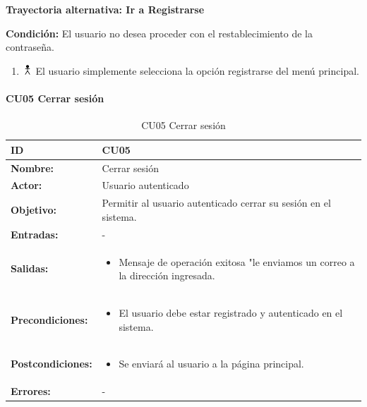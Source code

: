 \textbf{Trayectoria alternativa: Ir a Registrarse} 

\vspace{0.3em}

\textbf{Condición:} El usuario no desea proceder con el restablecimiento de la contraseña.
\begin{enumerate}
\item \includegraphics[height=1em]{pictures/actor.png} El usuario simplemente selecciona la opción registrarse del menú principal.
\end{enumerate} \bigskip



\paragraph{CU05 Cerrar sesión}

\begin{longtable}[H]{|p{}|p{12cm}|}
\hline\textbf{ID}         
& \textbf{CU05}            \\ \hline
\textbf{Nombre:}          
& Cerrar sesión       \\ \hline
\textbf{Actor:}          
& Usuario autenticado   \\ \hline
\textbf{Objetivo:}       
& Permitir al usuario autenticado cerrar su sesión en el sistema.\\ \hline
\textbf{Entradas:}  &  -
\\ \hline
\textbf{Salidas:}  &             
\begin{itemize}[nosep]
\item Mensaje de operación exitosa "le enviamos un correo a la dirección ingresada.
\end{itemize}
\\ \hline
\textbf{Precondiciones:}  &             
\begin{itemize}[nosep]
\item El usuario debe estar registrado y autenticado en el sistema.
\end{itemize}
\\ \hline
\textbf{Postcondiciones:} &             
\begin{itemize}[nosep]
\item Se enviará al usuario a la página principal.
\end{itemize}
\\ \hline
\textbf{Errores:}         & - 

\vspace{0.2em}

\caption{CU05 Cerrar sesión}
\label{table:1}
\end{longtable}

